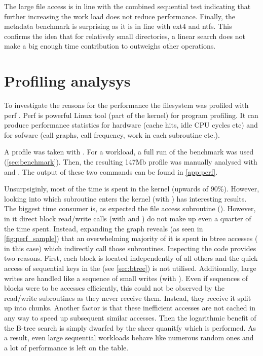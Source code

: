         The large file access is in line with the combined sequential test
        indicating that further increasing the work load does not reduce
        performance. Finally, the metadata benchmark is surprising as it is in
        line with ext4 and ntfs. This confirms the idea that for relatively
        small directories, a linear search does not make a big enough time
        contribution to outweighs other operations.

    \section{Profiling analysys}
        \label{sec:perf}

        To investigate the reasons for the performance the filesystem was
        profiled with perf \cite{perf}. Perf is powerful Linux tool (part of
        the kernel) for program profiling. It can produce performance
        statistics for hardware (cache hits, idle CPU cycles etc) and for
        sofware (call graphs, call frequency, work in each subroutine etc.).

        A profile was taken with . For a
        workload, a full run of the benchmark was used (\autoref{sec:benchmark}).
        Then, the resulting 147Mb profile was manually analysed with
         and . The output of these two commands can be found in
        \autoref{app:perf}.

        Unsurpsiginly, most of the time is spent in the kernel (upwards of
        90\%). However, looking into which subroutine enters the kernel (with
        ) has interesting results. The biggest time
        consumer is, as expected the file access subroutine
        (). However, in it direct block
        read/write calls (with  and
        ) do not make up even a quarter of the time
        spent. Instead, expanding the graph reveals (as seen in
        \autoref{fig:perf_sample}) that an overwhelming majority of it is spent in btree
        accesses ( in this case) which indirectly
        call those subroutines. Inspecting the code provides two reasons.
        First, each block is located independently of all others and the quick
        access of sequential keys in the \bplustree (see \autoref{sec:btree}) is
        not utilised. Additionally, large writes are handled like a sequence of
        small writes (with ). Even if
        sequences of blocks were to be accesses efficiently, this could not be
        observed by the read/write subroutines as they never receive them.
        Instead, they receive it split up into chunks. Another factor is that
        these inefficient accesses are not cached in any way to speed up
        subsequent similar accesses. Then the logarithmic benefit of the B-tree
        search is simply dwarfed by the sheer quanitfy which is performed. As a
        result, even large sequential workloads behave like numerous random
        ones and a lot of performance is left on the table.

